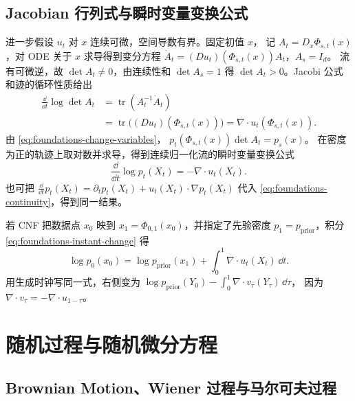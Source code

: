 \subsection{Jacobian 行列式与瞬时变量变换公式\requiredderivation}

进一步假设 \(u_t\) 对 \(x\) 连续可微，空间导数有界。固定初值 \(x\)，
记 \(A_t=D_x\Phi_{s,t}(x)\)，对 ODE 关于 \(x\) 求导得到变分方程
\(\dot A_t=(D u_t)(\Phi_{s,t}(x))A_t\)，\(A_s=I_d\)。
流有可微逆，故 \(\det A_t\ne0\)，由连续性和 \(\det A_s=1\) 得
\(\det A_t>0\)。Jacobi 公式和迹的循环性质给出
\begin{align*}
  \frac{\dd}{\dd t}\log\det A_t
    &=\operatorname{tr}(A_t^{-1}\dot A_t)\\
    &=\operatorname{tr}\bigl((D u_t)(\Phi_{s,t}(x))\bigr)
      =\nabla\cdot u_t(\Phi_{s,t}(x)).
\end{align*}
由 \eqref{eq:foundations-change-variables}，
\(p_t(\Phi_{s,t}(x))\det A_t=p_s(x)\)。
在密度为正的轨迹上取对数并求导，得到连续归一化流的瞬时变量变换公式
\cite{chen2018neuralode}
\begin{equation}
  \boxed{\frac{\dd}{\dd t}\log p_t(X_t)=-\nabla\cdot u_t(X_t).}
  \label{eq:foundations-instant-change}
\end{equation}
也可把 \(\frac{\dd}{\dd t}p_t(X_t)=\partial_t p_t(X_t)+u_t(X_t)\cdot\nabla p_t(X_t)\)
代入 \eqref{eq:foundations-continuity}，得到同一结果。

若 CNF 把数据点 \(x_0\) 映到 \(x_1=\Phi_{0,1}(x_0)\)，并指定了先验密度
\(p_1=p_{\mathrm{prior}}\)，积分 \eqref{eq:foundations-instant-change} 得
\begin{equation}
  \log p_0(x_0)
    =\log p_{\mathrm{prior}}(x_1)+\int_0^1\nabla\cdot u_t(X_t)\,\dd t .
  \label{eq:foundations-cnf-likelihood}
\end{equation}
用生成时钟写同一式，右侧变为
\(\log p_{\mathrm{prior}}(Y_0)-\int_0^1\nabla\cdot v_\tau(Y_\tau)\,\dd\tau\)，
因为 \(\nabla\cdot v_\tau=-\nabla\cdot u_{1-\tau}\)。

\section{随机过程与随机微分方程}

\subsection{Brownian Motion、Wiener 过程与马尔可夫过程}

